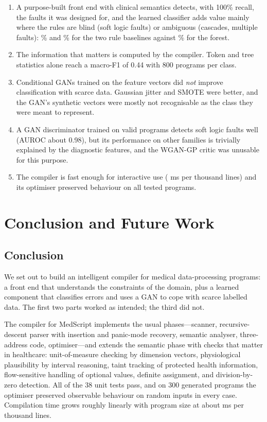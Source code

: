 \documentclass[conference]{IEEEtran}
\begin{document}
\begin{enumerate}
    \item A purpose-built front end with clinical semantics detects, with 100\% recall, the faults it was designed for, and the learned classifier
    adds value mainly where the rules are blind (soft logic faults) or ambiguous (cascades, multiple faults): \RuleFirstAcc\% and \RulePrioAcc\% for the two rule baselines against
    \RFAcc\% for the forest.
    \item The information that matters is computed by the compiler. Token and tree statistics alone reach a macro-F1 of 0.44 with 800 programs per class.
    \item Conditional GANs trained on the feature vectors did \emph{not} improve classification with scarce data. Gaussian jitter and SMOTE were better, and
    the GAN's synthetic vectors were mostly not recognisable as the class they were meant to represent.
    \item A GAN discriminator trained on valid programs detects soft logic faults well (AUROC about 0.98), but its performance on other families is
    trivially explained by the diagnostic features, and the WGAN-GP critic was unusable for this purpose.
    \item The compiler is fast enough for interactive use (\MsPerKloc{} ms per thousand lines) and its optimiser preserved behaviour on all tested programs.
\end{enumerate}


\section{Conclusion and Future Work}\label{sec:concl}

\subsection{Conclusion}

We set out to build an intelligent compiler for medical data-processing programs: a front end that understands the
constraints of the domain, plus a learned component that classifies errors and uses a GAN to cope with scarce labelled
data. The first two parts worked as intended; the third did not.

The compiler for MedScript implements the usual phases---scanner, recursive-descent parser with insertion and panic-mode recovery,
semantic analyser, three-address code, optimiser---and extends the semantic phase with checks that matter in healthcare:
unit-of-measure checking by dimension vectors, physiological plausibility by interval reasoning, taint tracking of protected
health information, flow-sensitive handling of optional values, definite assignment, and division-by-zero detection. All of the
38 unit tests pass, and on 300 generated programs the optimiser preserved observable behaviour on random inputs in every case. Compilation
time grows roughly linearly with program size at about \MsPerKloc{} ms per thousand lines.
\end{document}
